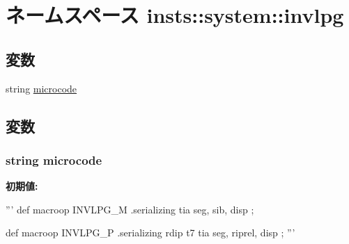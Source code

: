 \hypertarget{namespaceinsts_1_1system_1_1invlpg}{
\section{ネームスペース insts::system::invlpg}
\label{namespaceinsts_1_1system_1_1invlpg}
}
\subsection*{変数}
\begin{DoxyCompactItemize}
\item 
string \hyperlink{namespaceinsts_1_1system_1_1invlpg_a770f11a173e99389a8802f0107ed8f52}{microcode}
\end{DoxyCompactItemize}


\subsection{変数}
\hypertarget{namespaceinsts_1_1system_1_1invlpg_a770f11a173e99389a8802f0107ed8f52}{
\subsubsection[{microcode}]{\setlength{\rightskip}{0pt plus 5cm}string {\bf microcode}}}
\label{namespaceinsts_1_1system_1_1invlpg_a770f11a173e99389a8802f0107ed8f52}
{\bfseries 初期値:}
\begin{DoxyCode}
'''
def macroop INVLPG_M {
    .serializing
    tia seg, sib, disp
};

def macroop INVLPG_P {
    .serializing
    rdip t7
    tia seg, riprel, disp
};
'''
\end{DoxyCode}
